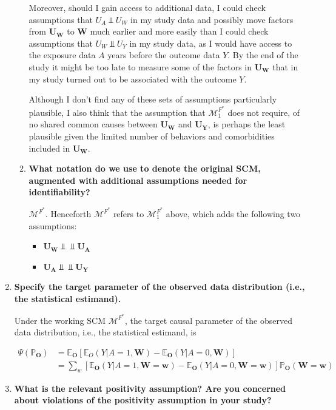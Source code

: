 \documentclass{article}\usepackage[]{graphicx}\usepackage[]{xcolor}
\begin{document}
\begin{enumerate}[label=\textbf{\arabic*.}]
\begin{enumerate}[label=\textbf{(\alph*)}]
Moreover, should I gain access to additional data, I could check assumptions that $U_A \Perp U_W$ in my study data and possibly move factors from $\bm{U_W}$ to $\bm{W}$ much earlier and more easily than I could check assumptions that $U_W \Perp U_Y$ in my study data, as I would have access to the exposure data $A$ years before the outcome data $Y$. By the end of the study it might be too late to measure some of the factors in $\bm{U_W}$ that in my study turned out to be associated with the outcome $Y$.

Although I don't find any of these sets of assumptions particularly plausible, I also think that the assumption that $\mathcal{M}^{F^*}_1$ does not require, of no shared common causes between $\bm{U_W}$ and $\bm{U_Y}$, is perhaps the least plausible given the limited number of behaviors and comorbidities included in $\bm{U_W}$.
    
    \item \textbf{What notation do we use to denote the original SCM, augmented with additional assumptions needed for identifiability?}
    
    $\mathcal{M}^{F^*}$. Henceforth $\mathcal{M}^{F^*}$ refers to $\mathcal{M}^{F^*}_1$ above, which adds the following two assumptions:
    
    \begin{itemize}
      \item $\bm{U_W} \Perp \!\!\!\! \Perp \bm{U_A}$
      \item $\bm{U_A} \Perp \!\!\!\! \Perp \bm{U_Y}$
    \end{itemize}
    
  \end{enumerate}
  
  \item \textbf{Specify the target parameter of the observed data distribution (i.e., the statistical estimand).}
  
Under the working SCM $\mathcal{M}^{F^*}$, the target causal parameter of the observed data distribution, i.e., the statistical estimand, is 
  
\begin{align*}
\Psi(\mathbb{P}_{\bm{O}}) &= \mathbb{E}_{\bm{O}}[\mathbb{E}_O(Y|A=1,\bm{W}) - \mathbb{E}_{\bm{O}}(Y|A=0,\bm{W})] \\
&= \sum_{w}[\mathbb{E}_{\bm{O}}(Y|A=1,\bm{W}=\bm{w}) - \mathbb{E}_{\bm{O}}(Y|A=0,\bm{W}=\bm{w})]\mathbb{P}_{\bm{O}}(\bm{W}=\bm{w})
\end{align*}
  
  \item \textbf{What is the relevant positivity assumption? Are you concerned about violations of the positivity assumption in your study?}
  

\end{enumerate}
\end{document}
